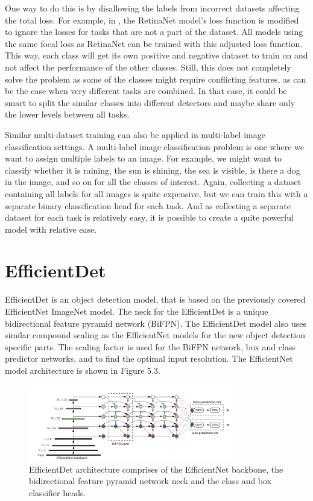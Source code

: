 One way to do this is by disallowing the labels from incorrect datasets affecting the total loss.
For example, in \citep{cross_data}, the RetinaNet \citep{retinaNet} model's loss function is modified to ignore the losses for tasks that are not a part of the dataset.
All models using the same focal loss as RetinaNet can be trained with this adjusted loss function.
This way, each class will get its own positive and negative dataset to train on and not affect the performance of the other classes.
Still, this does not completely solve the problem as some of the classes might require conflicting features, as can be the case when very different tasks are combined. 
In that case, it could be smart to split the similar classes into different detectors and maybe share only the lower levels between all tasks.

Similar multi-dataset training can also be applied in multi-label image classification settings.
A multi-label image classification problem is one where we want to assign multiple labels to an image.
For example, we might want to classify whether it is raining, the sun is shining, the sea is visible, is there a dog in the image, and so on for all the classes of interest.
Again, collecting a dataset containing all labels for all images is quite expensive, but we can train this with a separate binary classification head for each task.
And as collecting a separate dataset for each task is relatively easy, it is possible to create a quite powerful model with relative ease.

\section{EfficientDet}
EfficientDet \citep{efficientDet} is an object detection model, that is based on the previously covered EfficientNet ImageNet model.
The neck for the EfficientDet is a unique bidirectional feature pyramid network (BiFPN).
The EfficientDet model also uses similar compound scaling as the EfficientNet models for the new object detection specific parts.
The scaling factor is used for the BiFPN network, box and class predictor networks, and to find the optimal input resolution.
The EfficientNet model architecture is shown in Figure 5.3.

\begin{figure}[h!]
    \centering
    \includegraphics[width=0.8\textwidth]{imgs/efficientDet.png}
    \caption{EfficientDet architecture comprises of the EfficientNet \citep{efficientNet} backbone, the bidirectional feature pyramid network neck and the class and box classifier heads.}
\end{figure}

